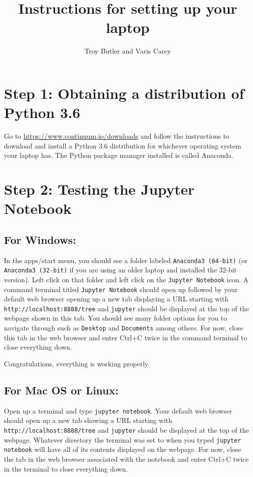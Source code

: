 \documentclass{amsart}
\theoremstyle{plain}
\theoremstyle{definition}
\theoremstyle{remark}
\theoremstyle{definition}
\numberwithin{equation}{section}
\numberwithin{equation}{section}
\begin{document}
\title{Instructions for setting up your laptop}
\author{Troy Butler and Varis Carey}

\maketitle

\section*{Step 1: Obtaining a distribution of Python 3.6}

Go to \href{https://www.continuum.io/downloads}{https://www.continuum.io/downloads} and follow the instructions to download and install a Python 3.6 distribution for whichever operating system your laptop has. 
The Python package manager installed is called Anaconda. 

\section*{Step 2: Testing the Jupyter Notebook}

\subsection*{For Windows:}

In the apps/start menu, you should see a folder labeled \verb|Anaconda3 (64-bit)| (or \verb|Anaconda3 (32-bit)| if you are using an older laptop and installed the 32-bit version). 
Left click on that folder and left click on the \verb|Jupyter Notebook| icon.
A command terminal titled \verb|Jupyter Notebook| should open up followed by your default web browser opening up a new tab displaying a URL starting with \verb|http://localhost:8888/tree| and \verb|jupyter| should be displayed at the top of the webpage shown in this tab. 
You should see many folder options for you to navigate through such as \verb|Desktop| and \verb|Documents| among others. 
For now, close this tab in the web browser and enter Ctrl+C twice in the command terminal to close everything down.

Congratulations, everything is working properly. 

\subsection*{For Mac OS or Linux:}

Open up a terminal and type \verb|jupyter notebook|. 
Your default web browser should open up a new tab showing a URL starting with \verb|http://localhost:8888/tree| and \verb|jupyter| should be displayed at the top of the webpage. 
Whatever directory the terminal was set to when you typed \verb|jupyter notebook| will have all of its contents displayed on the webpage. 
For now, close the tab in the web browser associated with the notebook and enter Ctrl+C twice in the terminal to close everything down.
\end{document}
